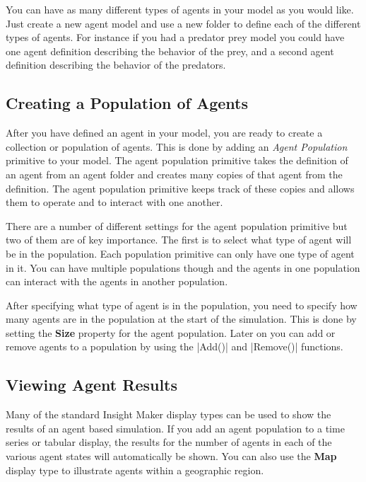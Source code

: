 \documentclass[]{memoir}
\newcommand{\FunctionTok}[1]{\textcolor[rgb]{0.02,0.16,0.49}{{#1}}}
\newcommand{\NormalTok}[1]{{#1}}
\renewcommand{\u}[1]{\textbf{#1}}
\renewcommand{\a}[1]{\textbf{#1}}
\begin{document}
You can have as many different types of agents in your model as you
would like. Just create a new agent model and use a new folder to define
each of the different types of agents. For instance if you had a
predator prey model you could have one agent definition describing the
behavior of the prey, and a second agent definition describing the
behavior of the predators.

\subsection{Creating a Population of Agents}

After you have defined an agent in your model, you are ready to create a
collection or population of agents. This is done by adding an
\emph{Agent Population} primitive to your model. The agent population
primitive takes the definition of an agent from an agent folder and
creates many copies of that agent from the definition. The agent
population primitive keeps track of these copies and allows them to
operate and to interact with one another.

There are a number of different settings for the agent population
primitive but two of them are of key importance. The first is to select
what type of agent will be in the population. Each population primitive
can only have one type of agent in it. You can have multiple populations
though and the agents in one population can interact with the agents in
another population.

After specifying what type of agent is in the population, you need to
specify how many agents are in the population at the start of the
simulation. This is done by setting the \a{Size} property for the agent
population. Later on you can add or remove agents to a population by
using the |\FunctionTok{Add}\NormalTok{()}| and
|\FunctionTok{Remove}\NormalTok{()}| functions.

\subsection{Viewing Agent Results}

Many of the standard Insight Maker display types can be used to show the
results of an agent based simulation. If you add an agent population to
a time series or tabular display, the results for the number of agents
in each of the various agent states will automatically be shown. You can
also use the \u{Map} display type to illustrate agents within a
geographic region.
\end{document}
